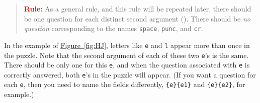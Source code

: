 \documentclass{article}
\let\tops\texorpdfstring
\begin{document}



\begin{quote}
\textbf{\textcolor{red}{Rule:}} As a general rule, and this rule will be
repeated later, there should be one question for each distinct second
argument (). There should be \emph{no question} corresponding to the
names \texttt{space}, \texttt{punc}, and \texttt{cr}.
\end{quote}
In the example of \hyperref[fig:HJ]{Figure~\ref*{fig:HJ}}, letters like \texttt{e} and \texttt{l} appear
more than once in the puzzle. Note that the second argument of each
of these two \texttt{e}'s is the same.  There should be only one for
this \texttt{e}, and when the question associated with \texttt{e} is
correctly answered, both \texttt{e}'s in the puzzle will appear. (If
you want a question for each \texttt{e}, then you need to name the
fields differently, \verb!{e}{e1}! and \verb!{e}{e2}!, for example.)
\end{document}
